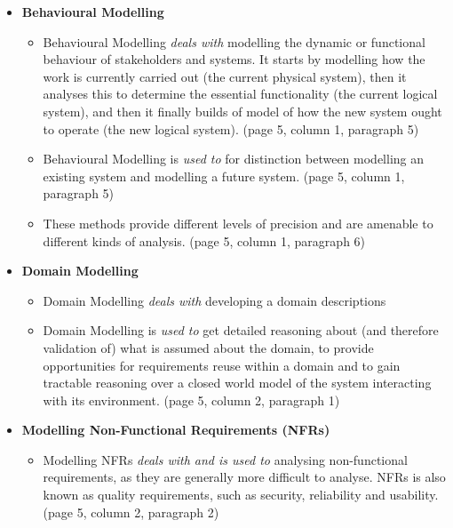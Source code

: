 \begin{enumerate}[a)]
\begin{itemize}
\begin{itemize}
        \end{itemize}
\newpage        
        \item \textbf{Behavioural Modelling}
        \begin{itemize}
            \item Behavioural Modelling \emph{deals with} modelling the dynamic or functional behaviour of  stakeholders and systems. It starts by modelling how the work is currently carried out (the current physical system), then it analyses this to determine the essential functionality (the current logical system), and then it finally builds of model of how the new system ought to operate (the new logical system). (page 5, column 1, paragraph 5)
            \item Behavioural Modelling is \emph{used to} for distinction between modelling an existing system and modelling a future system. (page 5, column 1, paragraph 5)
            \item These  methods  provide  different  levels  of precision  and  are  amenable  to  different  kinds  of  analysis. (page 5, column 1, paragraph 6) 
        \end{itemize}
        
        \item \textbf{Domain Modelling}
        \begin{itemize}
            \item Domain Modelling \emph{deals with} developing a domain descriptions
            \item Domain Modelling is \emph{used to} get detailed reasoning about (and therefore validation of) what is assumed about the domain, to provide opportunities for requirements reuse within a domain and to gain tractable reasoning over a closed world model of the system interacting with its environment. (page 5, column 2, paragraph 1) 
        \end{itemize}
        
        \item \textbf{Modelling Non-Functional Requirements (NFRs)}
        \begin{itemize}
            \item Modelling NFRs \emph{deals with and is used to} analysing non-functional requirements, as they are generally more difficult to analyse. NFRs is also known as quality requirements, such as
            security, reliability and usability. (page 5, column 2, paragraph 2) 
        \end{itemize}
        

\end{itemize}
\end{enumerate}

